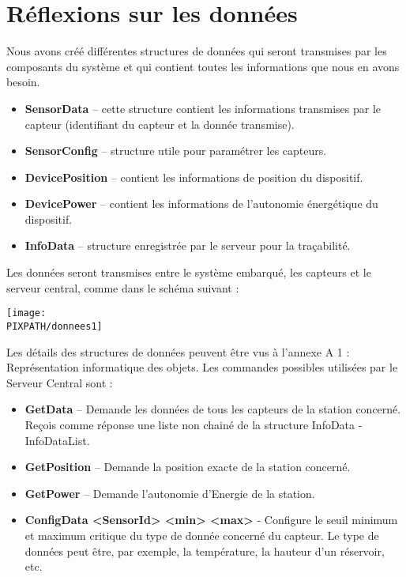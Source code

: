\section{Réflexions sur les données}

Nous avons créé différentes structures de données qui seront transmises par les composants du système et qui contient toutes les informations que nous en avons besoin. \\

\begin{itemize}
\item \textbf{SensorData} – cette structure contient les informations transmises par le capteur (identifiant du capteur et la donnée transmise).
\item \textbf{SensorConfig} –  structure utile pour paramétrer les capteurs.
\item \textbf{DevicePosition} – contient les informations de position du dispositif.
\item \textbf{DevicePower} – contient les informations de l’autonomie énergétique du dispositif.
\item \textbf{InfoData} – structure enregistrée par le serveur pour la traçabilité.
\end{itemize}

Les données seront transmises entre le système embarqué, les capteurs et le serveur central, comme dans le schéma suivant : \\

    \begin{center}
    \texttt{[image: \\PIXPATH/donnees1]}
    \end{center}

Les détails des structures de données peuvent être vus à  l’annexe A 1 : Représentation informatique des objets.
Les commandes possibles utilisées par le Serveur Central sont : \\

\begin{itemize}
\item \textbf{GetData} – Demande les données de tous les capteurs de la station concerné. Reçois comme réponse une liste non chainé de la structure InfoData  - InfoDataList.
\item \textbf{GetPosition} – Demande la position exacte de la station concerné.
\item \textbf{GetPower} – Demande l’autonomie d’Energie de la station.
\item \textbf{ConfigData <SensorId> <min> <max>} - Configure le seuil minimum et maximum critique du type de donnée concerné du capteur. Le type de données peut être, par exemple,  la température, la hauteur d’un réservoir, etc.
\end{itemize}

